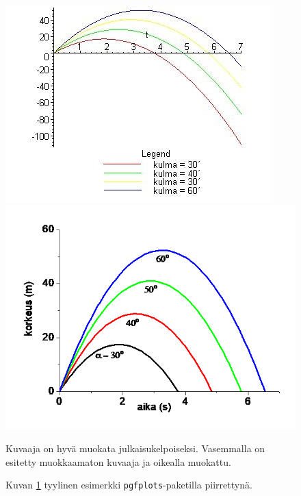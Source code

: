 \begin{figure}
\centering
\includegraphics[width=\textwidth]{figures/bad-example.jpg}
\includegraphics[width=\textwidth]{figures/good-example.png}
\caption[Tämä on lyhyt kuvateksti.]{Kuvaaja on hyvä muokata julkaisukelpoiseksi. Vasemmalla on esitetty muokkaamaton kuvaaja ja oikealla muokattu.}
\label{fig:huolittelu}
\end{figure}

\begin{figure}
\centering
%
\caption{Kuvan \ref{fig:huolittelu} tyylinen esimerkki \texttt{pgfplots}-paketilla piirrettynä.}
\label{fig:pgf-esimerkki}
\end{figure}

